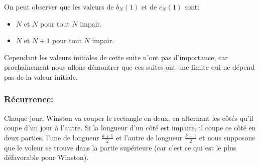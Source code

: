 On peut observer que les valeurs de $b_N(1)$ et de $c_N(1)$ sont:
\begin{itemize}
    \item $N$ et $N$ pour tout $N$ impair.
    \item $N$ et $N+1$ pour tout $N$ impair.
\end{itemize}
Cependant les valeurs initiales de cette suite n'ont pas d'importance, car prochainement nous allons démontrer que ces suites ont une limite qui ne dépend pas de la valeur initiale.
\subsubsection{Récurrence:}
Chaque jour, Winston va couper le rectangle en deux, en alternant les côtés qu'il coupe d'un jour à l'autre. Si la longueur d'un côté est impaire, il coupe ce côté en deux parties, l'une de longueur $\frac{k+1}{2}$ et l'autre de longueur $\frac{k-1}{2}$ et nous supposons que le voleur se trouve dans la partie supérieure (car c'est ce qui est le plus défavorable pour Winston).

